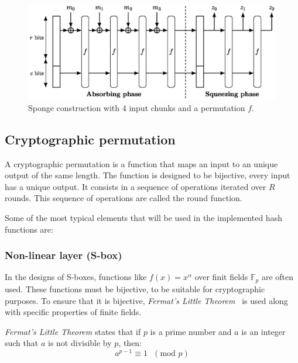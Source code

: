 \begin{figure}[htbp]
    \centering
    \includegraphics[width=\textwidth]{graphics/sponge.png}
    \caption{Sponge construction with 4 input chunks and a permutation $f$.}
    \label{fig:sponge-hash}
\end{figure}

\subsection{Cryptographic permutation}
A cryptographic permutation is a function that maps an input to an unique output of the same length. The function is designed to be bijective, every input has a unique output. It consists in a sequence of operations iterated over $R$ rounds. This sequence of operations are called the round function.

Some of the most typical elements that will be used in the implemented hash functions are:

\subsubsection*{Non-linear layer (S-box)}
\label{sec:s-box}
In the designs of S-boxes, functions like $f(x)=x^\alpha$ over finit fields $\mathbb{F}_p$ are often used. These functions must be bijective, to be suitable for cryptographic purposes. To ensure that it is bijective, \textit{Fermat's Little Theorem}~\cite{daepp2011fermat} is used along with specific properties of finite fields.

\textit{Fermat's Little Theorem} states that if $p$ is a prime number and $a$ is an integer such that $a$ is not divisible by $p$, then:
\begin{equation}
    a^{p-1}\equiv1\text{ }(\text{mod }p)
\end{equation}

